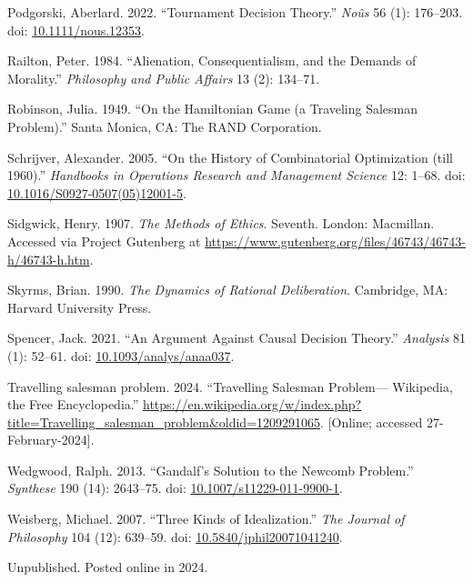 \documentclass[
  11pt,
  letterpaper,
  DIV=11,
  numbers=noendperiod,
  twoside]{scrartcl}
\newlength{\cslhangindent}
\newenvironment{CSLReferences}[2] %
 {\begin{list}{}{%
  \setlength{\itemindent}{0pt}
  \setlength{\leftmargin}{0pt}
  \setlength{\parsep}{0pt}
  \ifodd #1
   \setlength{\leftmargin}{\cslhangindent}
   \setlength{\itemindent}{-1\cslhangindent}
  \fi
  \setlength{\itemsep}{#2\baselineskip}}}
 {\end{list}}
\begin{document}
\begin{CSLReferences}{1}{0}
Podgorski, Aberlard. 2022. {``Tournament Decision Theory.''}
\emph{No{û}s} 56 (1): 176--203. doi:
\href{https://doi.org/10.1111/nous.12353}{10.1111/nous.12353}.

Railton, Peter. 1984. {``Alienation, Consequentialism, and the Demands
of Morality.''} \emph{Philosophy and Public Affairs} 13 (2): 134--71.

Robinson, Julia. 1949. {``On the Hamiltonian Game (a Traveling Salesman
Problem).''} Santa Monica, CA: The RAND Corporation.

Schrijver, Alexander. 2005. {``On the History of Combinatorial
Optimization (till 1960).''} \emph{Handbooks in Operations Research and
Management Science} 12: 1--68. doi:
\href{https://doi.org/10.1016/S0927-0507(05)12001-5}{10.1016/S0927-0507(05)12001-5}.

Sidgwick, Henry. 1907. \emph{The Methods of Ethics}. Seventh. London:
Macmillan. Accessed via Project Gutenberg at
\url{https://www.gutenberg.org/files/46743/46743-h/46743-h.htm}.

Skyrms, Brian. 1990. \emph{The Dynamics of Rational Deliberation}.
Cambridge, MA: Harvard University Press.

Spencer, Jack. 2021. {``An Argument Against Causal Decision Theory.''}
\emph{Analysis} 81 (1): 52--61. doi:
\href{https://doi.org/10.1093/analys/anaa037}{10.1093/analys/anaa037}.

Travelling salesman problem. 2024. {``Travelling Salesman Problem---
{W}ikipedia{,} the Free Encyclopedia.''}
\url{https://en.wikipedia.org/w/index.php?title=Travelling_salesman_problem&oldid=1209291065}.
{[}Online; accessed 27-February-2024{]}.

Wedgwood, Ralph. 2013. {``Gandalf's Solution to the Newcomb Problem.''}
\emph{Synthese} 190 (14): 2643--75. doi:
\href{https://doi.org/10.1007/s11229-011-9900-1}{10.1007/s11229-011-9900-1}.

Weisberg, Michael. 2007. {``Three Kinds of Idealization.''} \emph{The
Journal of Philosophy} 104 (12): 639--59. doi:
\href{https://doi.org/10.5840/jphil20071041240}{10.5840/jphil20071041240}.

\end{CSLReferences}



\noindent Unpublished. Posted online in 2024.
\end{document}
